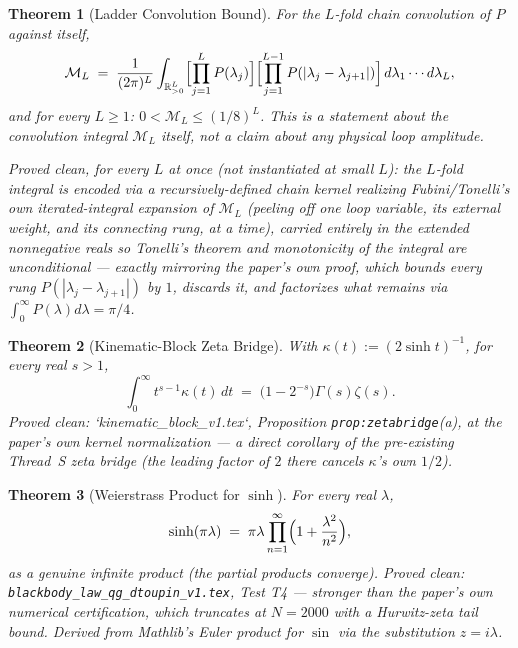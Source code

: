 \documentclass{report}
\newtheorem{theorem}{Theorem}[chapter]
\theoremstyle{definition}
\begin{document}
\begin{theorem}[Ladder Convolution Bound]
  \label{thm:all-loop-finiteness}
  \leanok
  For the $L$-fold chain convolution of $P$ against itself,
  \[
    \mathcal{M}_L \;=\; \frac{1}{(2\pi)^L}\int_{\mathbb{R}_{>0}^L}
      \Bigl[\prod_{j=1}^L P(\lambda_j)\Bigr]\Bigl[\prod_{j=1}^{L-1}P(|\lambda_j-\lambda_{j+1}|)\Bigr]
      \,d\lambda_1\cdots d\lambda_L,
  \]
  and for every $L \geq 1$: $0 < \mathcal{M}_L \leq (1/8)^L$. This is a statement about the
  convolution integral $\mathcal{M}_L$ itself, not a claim about any physical loop amplitude.

  \emph{Proved clean, for every $L$ at once} (not instantiated at small $L$): the $L$-fold
  integral is encoded via a recursively-defined chain kernel realizing Fubini/Tonelli's own
  iterated-integral expansion of $\mathcal{M}_L$ (peeling off one loop variable, its external
  weight, and its connecting rung, at a time), carried entirely in the extended
  nonnegative reals so Tonelli's theorem and monotonicity of the integral are unconditional
  --- exactly mirroring the paper's own proof, which bounds every rung $P(|\lambda_j-\lambda_{j+1}|)$
  by $1$, discards it, and factorizes what remains via $\int_0^\infty P(\lambda)d\lambda = \pi/4$.
\end{theorem}

\begin{theorem}[Kinematic-Block Zeta Bridge]
  \label{thm:kinematic-zeta-bridge}
  \leanok
  With $\kappa(t) := (2\sinh t)^{-1}$, for every real $s > 1$,
  \[
    \int_0^\infty t^{s-1}\kappa(t)\,dt \;=\; \bigl(1-2^{-s}\bigr)\Gamma(s)\zeta(s).
  \]
  \emph{Proved clean}: `kinematic\_block\_v1.tex`, Proposition \texttt{prop:zetabridge}(a),
  at the paper's own kernel normalization --- a direct corollary of the pre-existing
  Thread~S zeta bridge (the leading factor of $2$ there cancels $\kappa$'s own $1/2$).
\end{theorem}

\begin{theorem}[Weierstrass Product for \texorpdfstring{$\sinh$}{sinh}]
  \label{thm:sinh-weierstrass}
  \leanok
  For every real $\lambda$,
  \[
    \sinh(\pi\lambda) \;=\; \pi\lambda \prod_{n=1}^{\infty}\Bigl(1+\frac{\lambda^2}{n^2}\Bigr),
  \]
  as a genuine infinite product (the partial products converge).
  \emph{Proved clean}: \texttt{blackbody\_law\_qg\_dtoupin\_v1.tex}, Test T4 --- stronger
  than the paper's own numerical certification, which truncates at $N=2000$ with a
  Hurwitz-zeta tail bound. Derived from Mathlib's Euler product for $\sin$ via the
  substitution $z=i\lambda$.
\end{theorem}
\end{document}
